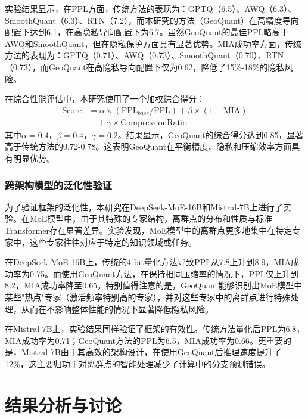 实验结果显示，在PPL方面，传统方法的表现为：GPTQ（6.5）、AWQ（6.3）、SmoothQuant（6.3）、RTN（7.2），而本研究的方法（GeoQuant）在高精度导向配置下达到6.1，在高隐私导向配置下为6.7。虽然GeoQuant的最佳PPL略高于AWQ和SmoothQuant，但在隐私保护方面具有显著优势。MIA成功率方面，传统方法的表现为：GPTQ（0.71）、AWQ（0.73）、SmoothQuant（0.70）、RTN（0.73），而GeoQuant在高隐私导向配置下仅为0.62，降低了15\%-18\%的隐私风险。

在综合性能评估中，本研究使用了一个加权综合得分：
\begin{align}
\text{Score} &= \alpha \times (\text{PPL}_{base}/\text{PPL}) + \beta \times (1 - \text{MIA}) \nonumber \\
&\quad + \gamma \times \text{CompressionRatio}
\end{align}
其中$\alpha=0.4$，$\beta=0.4$，$\gamma=0.2$。结果显示，GeoQuant的综合得分达到0.85，显著高于传统方法的0.72-0.78。这表明GeoQuant在平衡精度、隐私和压缩效率方面具有明显优势。

\subsubsection{跨架构模型的泛化性验证}

为了验证框架的泛化性，本研究在DeepSeek-MoE-16B和Mistral-7B上进行了实验。在MoE模型中，由于其特殊的专家结构，离群点的分布和性质与标准Transformer存在显著差异。实验发现，MoE模型中的离群点更多地集中在特定专家中，这些专家往往对应于特定的知识领域或任务。

在DeepSeek-MoE-16B上，传统的4-bit量化方法导致PPL从7.8上升到8.9，MIA成功率为0.75。而使用GeoQuant方法，在保持相同压缩率的情况下，PPL仅上升到8.2，MIA成功率降至0.65。特别值得注意的是，GeoQuant能够识别出MoE模型中某些"热点"专家（激活频率特别高的专家），并对这些专家中的离群点进行特殊处理，从而在不影响整体性能的情况下显著降低隐私风险。

在Mistral-7B上，实验结果同样验证了框架的有效性。传统方法量化后PPL为6.8，MIA成功率为0.71；GeoQuant方法的PPL为6.5，MIA成功率为0.66。更重要的是，Mistral-7B由于其高效的架构设计，在使用GeoQuant后推理速度提升了12\%，这主要归功于对离群点的智能处理减少了计算中的分支预测错误。

\section{结果分析与讨论}

